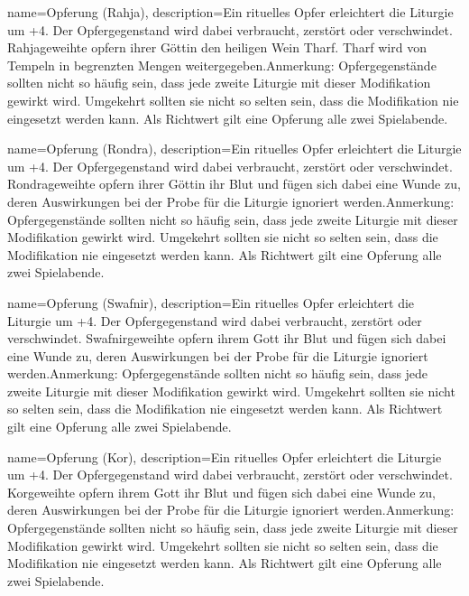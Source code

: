 {
    name={Opferung (Rahja)},
    description={Ein rituelles Opfer erleichtert die Liturgie um +4. Der Opfergegenstand wird dabei verbraucht, zerstört oder verschwindet. Rahjageweihte opfern ihrer Göttin den heiligen Wein Tharf. Tharf wird von Tempeln in begrenzten Mengen weitergegeben.\newline Anmerkung: Opfergegenstände sollten nicht so häufig sein, dass jede zweite Liturgie mit dieser Modifikation gewirkt wird. Umgekehrt sollten sie nicht so selten sein, dass die Modifikation nie eingesetzt werden kann. Als Richtwert gilt eine Opferung alle zwei Spielabende.}
}


{
    name={Opferung (Rondra)},
    description={Ein rituelles Opfer erleichtert die Liturgie um +4. Der Opfergegenstand wird dabei verbraucht, zerstört oder verschwindet. Rondrageweihte opfern ihrer Göttin ihr Blut und fügen sich dabei eine Wunde zu, deren Auswirkungen bei der Probe für die Liturgie ignoriert werden.\newline Anmerkung: Opfergegenstände sollten nicht so häufig sein, dass jede zweite Liturgie mit dieser Modifikation gewirkt wird. Umgekehrt sollten sie nicht so selten sein, dass die Modifikation nie eingesetzt werden kann. Als Richtwert gilt eine Opferung alle zwei Spielabende.}
}


{
    name={Opferung (Swafnir)},
    description={Ein rituelles Opfer erleichtert die Liturgie um +4. Der Opfergegenstand wird dabei verbraucht, zerstört oder verschwindet. Swafnirgeweihte opfern ihrem Gott ihr Blut und fügen sich dabei eine Wunde zu, deren Auswirkungen bei der Probe für die Liturgie ignoriert werden.\newline Anmerkung: Opfergegenstände sollten nicht so häufig sein, dass jede zweite Liturgie mit dieser Modifikation gewirkt wird. Umgekehrt sollten sie nicht so selten sein, dass die Modifikation nie eingesetzt werden kann. Als Richtwert gilt eine Opferung alle zwei Spielabende.}
}


{
    name={Opferung (Kor)},
    description={Ein rituelles Opfer erleichtert die Liturgie um +4. Der Opfergegenstand wird dabei verbraucht, zerstört oder verschwindet. Korgeweihte opfern ihrem Gott ihr Blut und fügen sich dabei eine Wunde zu, deren Auswirkungen bei der Probe für die Liturgie ignoriert werden.\newline Anmerkung: Opfergegenstände sollten nicht so häufig sein, dass jede zweite Liturgie mit dieser Modifikation gewirkt wird. Umgekehrt sollten sie nicht so selten sein, dass die Modifikation nie eingesetzt werden kann. Als Richtwert gilt eine Opferung alle zwei Spielabende.}
}


